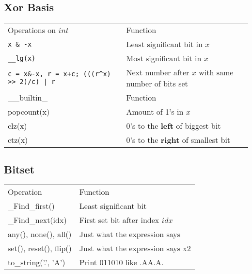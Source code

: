 
\subsection{Xor Basis}

\begin{tabular}{ |p{3cm}|p{5cm}|  }
  \hline  
  \rowcolor{Blue} 
  \multicolumn{2}{|c|}{Bits++} \\
  \hline
  \rowcolor{LightBlue2} 
  Operations on $int$ & Function \\
  \hline
  \texttt{x \& -x} & Least significant bit in $x$ \\
  \rowcolor{Gray} 
  \texttt{\_\_lg(x)} & Most significant bit in $x$ \\
  \texttt{c = x\&-x, r = x+c; (((r\^{}x) >> 2)/c) | r} & Next number after $x$ with same number of bits set \\
  \hline

  \rowcolor{LightBlue2} 
  \_\_builtin\_ & Function \\
  \hline 
  popcount(x) & Amount of 1's in $x$ \\
  \rowcolor{Gray} 
  clz(x) & 0's to the \textbf{left} of biggest bit \\
  ctz(x) & 0's to the \textbf{right} of smallest bit \\
  \hline
\end{tabular}

\subsection{Bitset} 
\vspace{-5pt}

\begin{tabular}{ |p{3cm}|p{5cm}|  }
  \hline 
  \rowcolor{Blue} 
  \multicolumn{2}{|c|}{Bitset<Size>} \\
  \hline
  \rowcolor{LightBlue2} 
  Operation & Function \\
  \hline
  \_Find\_first() & Least significant bit \\
  \rowcolor{Gray} 
  \_Find\_next(idx) & First set bit after index $idx$ \\
  any(), none(), all() & Just what the expression says \\
  \rowcolor{Gray} 
  set(), reset(), flip() & Just what the expression says x2 \\
  to\_string('.', 'A') & Print 011010 like .AA.A. \\
  \hline
\end{tabular}